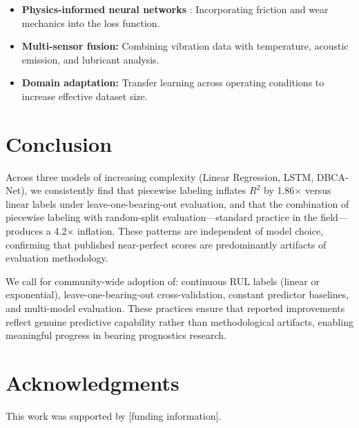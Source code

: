 \documentclass[5p,twocolumn]{elsarticle}
\begin{document}
\begin{itemize}
    \item \textbf{Physics-informed neural networks} \cite{li2022physics}: Incorporating friction and wear mechanics into the loss function.
    \item \textbf{Multi-sensor fusion:} Combining vibration data with temperature, acoustic emission, and lubricant analysis.
    \item \textbf{Domain adaptation:} Transfer learning across operating conditions to increase effective dataset size.
\end{itemize}


\section{Conclusion}
\label{sec:conclusion}

Across three models of increasing complexity (Linear Regression, LSTM, DBCA-Net), we consistently find that piecewise labeling inflates $R^2$ by 1.86$\times$ versus linear labels under leave-one-bearing-out evaluation, and that the combination of piecewise labeling with random-split evaluation---standard practice in the field---produces a 4.2$\times$ inflation. These patterns are independent of model choice, confirming that published near-perfect scores are predominantly artifacts of evaluation methodology.

We call for community-wide adoption of: continuous RUL labels (linear or exponential), leave-one-bearing-out cross-validation, constant predictor baselines, and multi-model evaluation. These practices ensure that reported improvements reflect genuine predictive capability rather than methodological artifacts, enabling meaningful progress in bearing prognostics research.


\section*{Acknowledgments}

This work was supported by [funding information].
\end{document}
